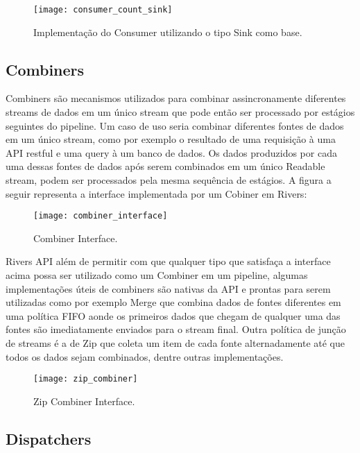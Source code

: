 \begin{figure}[H]
  \texttt{[image: consumer\_count\_sink]}
  \centering
  \caption{Implementação do Consumer utilizando o tipo Sink como base.}
  \label{code:rivers:consumer_count_sink}
\end{figure}

\subsection{Combiners}
\label{sec:rivers:combiners}

Combiners são mecanismos utilizados para combinar assincronamente diferentes streams de dados em um único stream que pode então ser processado por estágios seguintes do pipeline. Um caso de uso seria combinar diferentes fontes de dados em um único stream, como por exemplo o resultado de uma requisição à uma API restful e uma query à um banco de dados. Os dados produzidos por cada uma dessas fontes de dados após serem combinados em um único Readable stream, podem ser processados pela mesma sequência de estágios. A figura a seguir representa a interface implementada por um Cobiner em Rivers:

\begin{figure}[H]
  \texttt{[image: combiner\_interface]}
  \centering
  \caption{Combiner Interface.}
  \label{code:rivers:combiner}
\end{figure}

Rivers API além de permitir com que qualquer tipo que satisfaça a interface acima possa ser utilizado como um Combiner em um pipeline, algumas implementações úteis de combiners são nativas da API e prontas para serem utilizadas como por exemplo Merge que combina dados de fontes diferentes em uma política FIFO aonde os primeiros dados que chegam de qualquer uma das fontes são imediatamente enviados para o stream final. Outra política de junção de streams é a de Zip que coleta um item de cada fonte alternadamente até que todos os dados sejam combinados, dentre outras implementações.

\begin{figure}[H]
  \texttt{[image: zip\_combiner]}
  \centering
  \caption{Zip Combiner Interface.}
  \label{code:rivers:zip_combiner}
\end{figure}

\subsection{Dispatchers}
\label{sec:rivers:dispatchers}

